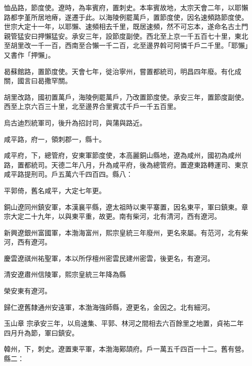 \begin{pinyinscope}
 恤品路，節度使。遼時，為率賓府，置刺史。本率賓故地，太宗天會二年，以耶懶路都孛堇所居地瘠，遂遷于此。以海陵例罷萬戶，置節度使，因名速頻路節度使。
 世宗大定十一年，以耶懶、速頻相去千里，既居速頻，然不可忘本，遂命名古土門親管猛安曰押懶猛安。承安三年，設節度副使。西北至上京一千五百七十里，東北至胡里改一千一百，西南至合懶一千二百，北至邊界斡可阿憐千戶二千里。「耶懶」又書作「押懶」。



 曷蘇館路，置節度使。天會七年，徙治寧州，嘗置都統司，明昌四年廢。有化成關，國言曰曷撒罕關。



 胡里改路，國初置萬戶，海陵例罷萬戶，乃改置節度使。承安三年，置節度副使。西至上京六百三十里，北至邊界合里賓忒千戶一千五百里。



 烏古迪烈統軍司，後升為招討司，與蒲與路近。



 咸平路，府一，領刺郡一，縣十。



 咸平府，下，總管府，安東軍節度使，本高麗銅山縣地，遼為咸州，國初為咸州路，置都統司。天德二年八月，升為咸平府，後為總管府。置遼東路轉運司、東京咸平路提刑司。戶五萬六千四百四。縣八：



 平郭倚，舊名咸平，大定七年更。



 銅山遼同州鎮安軍，本漢襄平縣，遼太祖時以東平寨置，因名東平，軍曰鎮東。章宗大定二十九年，以與東平重，故更。南有柴河，北有清河，西有遼河。



 新興遼銀州富國軍，本渤海富州，熙宗皇統三年廢州，更名來屬。有范河，北有柴河，西有遼河。



 慶雲遼祺州祐聖軍，本以所俘檀州密雲民建州密雲，後更名，有遼河。



 清安遼肅州信陵軍，熙宗皇統三年降為縣



 榮安東有遼河。



 歸仁遼舊隸通州安遠軍，本渤海強師縣，遼更名，金因之。北有細河。



 玉山章
 宗承安三年，以烏速集、平郭、林河之間相去六百餘里之地置，貞祐二年四月升為節，軍曰鎮安。



 韓州，下，刺史。遼置東平軍，本渤海鄚頡府。戶一萬五千四百一十二。舊有營。縣二：




\end{pinyinscope}
